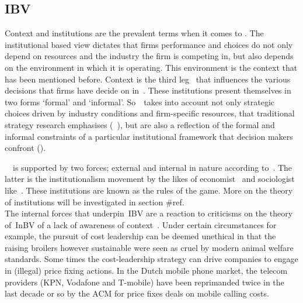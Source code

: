 \subsection{\glsdesc{IBV}}
 
 Context and institutions are the prevalent terms when it comes to \ibv. 
The institutional based view dictates that firms performance and choices do not only depend on resources and the industry the firm is competing in, but also depends on the environment in which it is operating. 
This environment is the context that has been mentioned before.
Context is the third leg~\cite{Peng:2009} that influences the various decisions that firms have decide on in~\ib. 
These institutions present themselves in two forms `formal' and `informal'. 
So~\ibv~takes into account not only strategic choices driven by industry conditions and firm-specific resources, that traditional strategy research emphasises (~\cite{Porter:1980,Barney:1991}), but are also a reflection of the formal and informal constraints of a particular institutional framework that decision makers confront (\cite{Oliver:1997,Scott:1995}). 

~\ibv~is supported by two forces; external and internal in nature according to~\cite{Peng:2009}. 
The latter is the institutionalism movement by the likes of economist~\cite{North:1990} and sociologist like~\cite{DiMaggio:1983,Scott:1995}. 
These institutions are known as the rules of the game.
More on the theory of institutions will be investigated in section #ref.\\

The internal forces that underpin~\gls{IBV} are a reaction to criticisms on the theory of~\gls{InBV} of a lack of awareness of context~\cite{Narayanan:2005}. 
Under certain circumstances for example, the pursuit of cost leadership can be deemed unethical in that the raising broilers however sustainable were seen as cruel by modern animal welfare standards. 
Some times the cost-leadership strategy can drive companies to engage in (illegal) price fixing actions. 
In the Dutch mobile phone market, the telecom providers (KPN, Vodafone and T-mobile) have been reprimanded twice in the last decade or so by the \gls{ACM} for price fixes deals on mobile calling costs. \\

